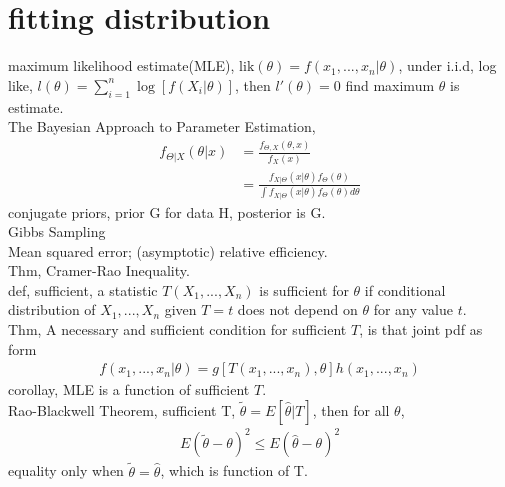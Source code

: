 \documentclass[paper=a4, fontsize=11pt]{scrartcl} %
\numberwithin{equation}{section} %
\numberwithin{figure}{section} %
\numberwithin{table}{section} %
\begin{document}
\section{fitting distribution}
maximum likelihood estimate(MLE), $\text{lik}(\theta) = f(x_1,...,x_n|\theta)$, under i.i.d, log like, $l(\theta) = \sum_{i=1}^n \log [f(X_i|\theta)]$, then $l'(\theta)=0$ find maximum $\theta$ is estimate.\\
The Bayesian Approach to Parameter Estimation, 
\begin{align}
	f_{\Theta| X}(\theta|x) &= \frac{f_{\Theta,X}(\theta,x)}{f_X(x)} \\
		&= \frac{f_{X|\Theta}(x|\theta)f_\Theta(\theta)} {\int f_{X|\Theta}(x|\theta)f_\Theta(\theta) d\theta}
\end{align}
conjugate priors, prior G for data H, posterior is G.\\
Gibbs Sampling\\
Mean squared error; (asymptotic) relative efficiency.\\
Thm, Cramer-Rao Inequality.\\
def, sufficient, a statistic $T(X_1,...,X_n)$ is sufficient for $\theta$ if conditional distribution of $X_1,...,X_n$ given $T=t$ does not depend on $\theta$ for any value $t$.\\
Thm, A necessary and sufficient condition for sufficient $T$, is that joint pdf as form
\begin{align}
	f(x_1,...,x_n|\theta) = g[T(x_1,...,x_n),\theta] h(x_1,...,x_n)
\end{align}
corollay, MLE is a function of sufficient $T$.\\
Rao-Blackwell Theorem, sufficient T, $\tilde{\theta}=E[\widehat{\theta}|T]$, then for all $\theta$,
\begin{align}
	E(\tilde{\theta}-\theta)^2 \leq E(\widehat{\theta}-\theta)^2
\end{align}
equality only when $\tilde{\theta}=\widehat{\theta}$, which is function of T.
\end{document}
